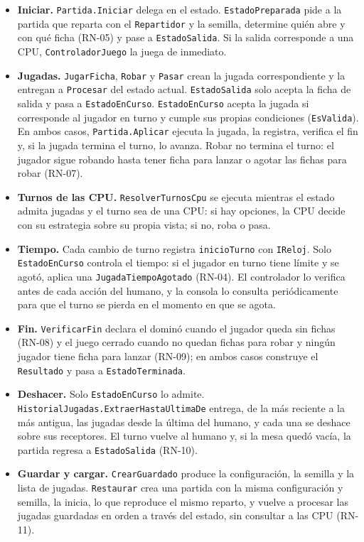 \begin{itemize}
  \item \textbf{Iniciar.} \texttt{Partida.Iniciar} delega en el estado. \texttt{EstadoPreparada} pide a la partida que reparta con el \texttt{Repartidor} y la semilla, determine quién abre y con qué ficha (RN-05) y pase a \texttt{EstadoSalida}. Si la salida corresponde a una CPU, \texttt{ControladorJuego} la juega de inmediato.
  \item \textbf{Jugadas.} \texttt{JugarFicha}, \texttt{Robar} y \texttt{Pasar} crean la jugada correspondiente y la entregan a \texttt{Procesar} del estado actual. \texttt{EstadoSalida} solo acepta la ficha de salida y pasa a \texttt{EstadoEnCurso}. \texttt{EstadoEnCurso} acepta la jugada si corresponde al jugador en turno y cumple sus propias condiciones (\texttt{EsValida}). En ambos casos, \texttt{Partida.Aplicar} ejecuta la jugada, la registra, verifica el fin y, si la jugada termina el turno, lo avanza. Robar no termina el turno: el jugador sigue robando hasta tener ficha para lanzar o agotar las fichas para robar (RN-07).
  \item \textbf{Turnos de las CPU.} \texttt{ResolverTurnosCpu} se ejecuta mientras el estado admita jugadas y el turno sea de una CPU: si hay opciones, la CPU decide con su estrategia sobre su propia vista; si no, roba o pasa.
  \item \textbf{Tiempo.} Cada cambio de turno registra \texttt{inicioTurno} con \texttt{IReloj}. Solo \texttt{EstadoEnCurso} controla el tiempo: si el jugador en turno tiene límite y se agotó, aplica una \texttt{JugadaTiempoAgotado} (RN-04). El controlador lo verifica antes de cada acción del humano, y la consola lo consulta periódicamente para que el turno se pierda en el momento en que se agota.
  \item \textbf{Fin.} \texttt{VerificarFin} declara el dominó cuando el jugador queda sin fichas (RN-08) y el juego cerrado cuando no quedan fichas para robar y ningún jugador tiene ficha para lanzar (RN-09); en ambos casos construye el \texttt{Resultado} y pasa a \texttt{EstadoTerminada}.
  \item \textbf{Deshacer.} Solo \texttt{EstadoEnCurso} lo admite. \texttt{HistorialJugadas.ExtraerHastaUltimaDe} entrega, de la más reciente a la más antigua, las jugadas desde la última del humano, y cada una se deshace sobre sus receptores. El turno vuelve al humano y, si la mesa quedó vacía, la partida regresa a \texttt{EstadoSalida} (RN-10).
  \item \textbf{Guardar y cargar.} \texttt{CrearGuardado} produce la configuración, la semilla y la lista de jugadas. \texttt{Restaurar} crea una partida con la misma configuración y semilla, la inicia, lo que reproduce el mismo reparto, y vuelve a procesar las jugadas guardadas en orden a través del estado, sin consultar a las CPU (RN-11).
\end{itemize}

